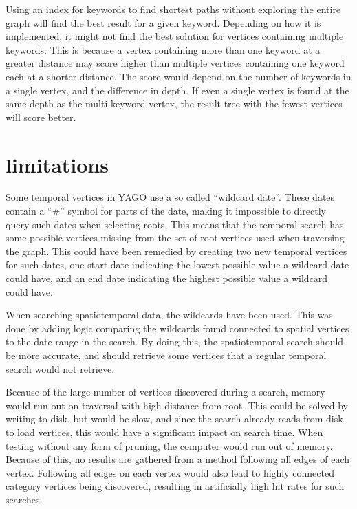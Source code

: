 Using an index for keywords to find shortest paths without exploring the entire graph will find the best result for a given keyword. Depending on how it is implemented, it might not find the best solution for vertices containing multiple keywords. This is because a vertex containing more than one keyword at a greater distance may score higher than multiple vertices containing one keyword each at a shorter distance. The score would depend on the number of keywords in a single vertex, and the difference in depth. If even a single vertex is found at the same depth as the multi-keyword vertex, the result tree with the fewest vertices will score better.

\section{limitations}
Some temporal vertices in YAGO use a so called ``wildcard date''. These dates contain a ``\#'' symbol for parts of the date, making it impossible to directly query such dates when selecting roots. This means that the temporal search has some possible vertices missing from the set of root vertices used when traversing the graph. This could have been remedied by creating two new temporal vertices for such dates, one start date indicating the lowest possible value a wildcard date could have, and an end date indicating the highest possible value a wildcard could have.

When searching spatiotemporal data, the wildcards have been used. This was done by adding logic comparing the wildcards found connected to spatial vertices to the date range in the search. By doing this, the spatiotemporal search should be more accurate, and should retrieve some vertices that a regular temporal search would not retrieve.

Because of the large number of vertices discovered during a search, memory would run out on traversal with high distance from root. This could be solved by writing to disk, but would be slow, and since the search already reads from disk to load vertices, this would have a significant impact on search time. When testing without any form of pruning, the computer would run out of memory. Because of this, no results are gathered from a method following all edges of each vertex. Following all edges on each vertex would also lead to highly connected category vertices being discovered, resulting in artificially high hit rates for such searches.